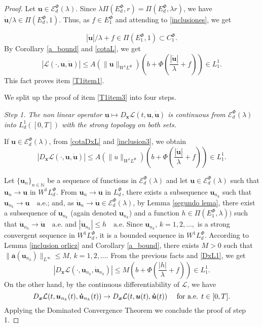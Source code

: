 \documentclass[twoside]{elsarticle}
\theoremstyle{remark}
\newcommand{\lphi}{L^{\Phi}}
\newcommand{\ephi}{E^{\Phi}}
\newcommand{\claseor}{C^{\Phi}}
\newcommand{\wphi}{W^{1}\lphi}
\newcommand{\sobnor}{\|_{W^{1}\lphi}}
\newcommand{\domi}{\mathcal{E}^{\Phi}_d(\lambda)}
\renewcommand{\b}[1]{\boldsymbol{#1}}
\renewcommand{\leq}{\leqslant}
\begin{document}
\begin{proof} Let $\b{u}\in \domi$.
 Since  $\lambda\Pi(\ephi_d,r)=\Pi(\ephi_d,\lambda r)$, we have   $\b{\dot{u}}/\lambda\in\Pi(\ephi_d,1)$. 
Thus, as $f\in\ephi_1$ and attending to \eqref{inclusiones}, we get 

\begin{equation}\label{inclusion3}
|\b{\dot{u}}|/\lambda+f\in\Pi(\ephi_1,1)\subset \claseor_1.
\end{equation}
By Corollary \ref{a_bound} and \eqref{cotaL}, we get 
 \[|\mathcal{L}(\cdot,\b{u},\b{\dot{u}})| \leq A(\|\b{u}\sobnor ) \left(b+ \Phi\left (\frac{|\b{\dot{u}}|}{\lambda}+f\right)  \right)\in
 L^1_1.\]
This fact proves item \ref{T1item1}.

 We split up the proof of item \ref{T1item3} into four steps.

\noindent\emph{Step 1. The non linear operator  $\b{u} \mapsto D_{\b{x}}\mathcal{L}(t,\b{u},\b{\dot{u}})$ is continuous from $\domi$ into $L^{1}_d([0,T])$ with the strong topology on both sets.} 


If $\b{u}\in \domi$, from \eqref{cotaDxL} and \eqref{inclusion3}, we obtain 
\begin{equation}\label{DxL1}
|D_{\b{x}}\mathcal{L}(\cdot,\b{u},\b{\dot{u}})|\leq A(\|u\sobnor) \left(b+\Phi\left(\frac{|\b{\dot{u}}|}{\lambda}+f\right)\right) \in L^1_1.
\end{equation}


Let   $\{\b{u}_n\}_{n\in \mathbb{N}}$ be a sequence of  functions in $\domi$  and let $\b{u}\in \domi$  such that $\b{u}_n\rightarrow \b{u}$ in $\wphi_d$.
From  $\b{u}_n\rightarrow \b{u}$ in $\lphi_d$, there exists a subsequence $\b{u}_{n_k}$ such that $\b{u}_{n_k}\rightarrow \b{u} \quad\text{a.e.}$; and, as $\b{\dot{u}}_n\rightarrow \b{\dot{u}}\in\domi$, by 
  Lemma \ref{segundo lema}, there exist a subsequence of  $\b{u}_{n_k}$ (again denoted $\b{u}_{n_k}$) and a function  $h\in \Pi(\ephi_1,\lambda))$
such that  $\b{\dot{u}}_{n_k}\rightarrow \b{\dot{u}} \quad\text{a.e.}$ and $|\b{\dot{u}}_{n_k}|\leq h\quad\text{a.e}$.  Since $\b{u}_{n_k}$, $k=1,2,\ldots,$ is a strong convergent sequence in $\wphi_d$, it is a bounded sequence in $\wphi_d$. According to Lemma \ref{inclusion orlicz} and Corollary \ref{a_bound}, there exists $M>0$ such that $\|\b{a}(\b{u}_{n_k})\|_{L^{\infty}} \leq M$, $k=1,2,\ldots$.  From the previous facts and \eqref{DxL1}, we get
\begin{equation*}\label{DxL1-bis}
|D_{\b{x}}\mathcal{L}(\cdot,\b{u}_{n_k},\b{\dot{u}}_{n_k})|\leq M\left(b+\Phi\left(\frac{|h|}{\lambda}+f\right)\right) \in L^1_1.
\end{equation*}
On the other hand, by the continuous differentiability of $\mathcal{L}$, we have
\[D_{\b{x}}\mathcal{L}(t,\b{u}_{n_k}(t),\b{\dot{u}}_{n_k}(t))\to D_{\b{x}}\mathcal{L}(t,\b{u}(t),\b{\dot{u}}(t))\quad\hbox{ for a.e. } t\in[0,T].\]
Applying the Dominated Convergence Theorem we conclude the proof of step 1.


\end{proof}
\end{document}
